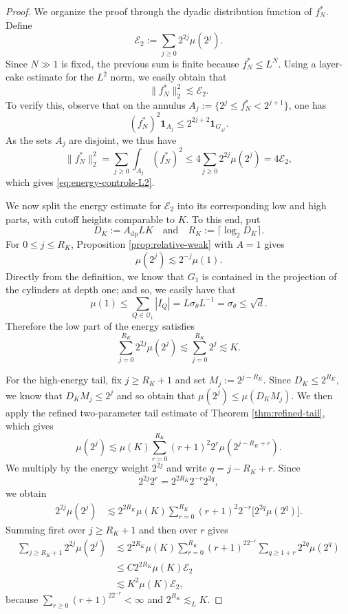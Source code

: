 \documentclass[12pt]{amsart}
\numberwithin{equation}{section}
\begin{document}
\begin{proof}
We organize the proof through the dyadic distribution function of $f_N^*$.  Define
\begin{equation}\label{eq:dyadic-energy}
 \mathcal E_2:=\sum_{j\geq0}2^{2j}\mu(2^j).
\end{equation}
Since $N \gg 1$ is fixed, the previous sum is finite because $f_N^*\leq L^N$.  Using a layer-cake estimate for the $L^2$ norm, we easily obtain that
\begin{equation}\label{eq:energy-controls-L2}
 \|f_N^*\|_2^2\lesssim\mathcal E_2.
\end{equation}
To verify this, observe that on the annulus $A_j:=\{2^j\leq f_N^*<2^{j+1}\}$, one has
\[
 (f_N^*)^2\mathbf1_{A_j}\leq2^{2j+2}\mathbf1_{G_{2^j}}.
\]
As the sets $A_j$ are disjoint, we thus have
\[
 \|f_N^*\|_2^2
 =\sum_{j\geq0}\int_{A_j}(f_N^*)^2
 \leq4\sum_{j\geq0}2^{2j}\mu(2^j)
 =4\mathcal E_2,
\]
which gives \eqref{eq:energy-controls-L2}.

We now split the energy estimate for $\mathcal{E}_2$ into its corresponding low and high parts, with cutoff heights comparable to $K$.  To this end, put
\[
 D_K:=A_{\mathrm{dp}}LK
 \quad \textrm{and} \quad 
 R_K:=\lceil\log_2D_K\rceil.
\]
For $0\leq j\leq R_K$, Proposition \ref{prop:relative-weak} with $A=1$ gives
\[
 \mu(2^j)\lesssim2^{-j}\mu(1).
\]
Directly from the definition, we know that $G_1$ is contained in the projection of the cylinders at depth one; and so, we easily have that
\[
 \mu(1)\leq\sum_{Q\in\mathscr Q_1}|I_Q|
 =L\sigma_\theta L^{-1}=\sigma_\theta\leq\sqrt d.
\]
Therefore the low part of the energy satisfies
\begin{equation}\label{eq:low-energy}
 \sum_{j=0}^{R_K}2^{2j}\mu(2^j)
 \lesssim\sum_{j=0}^{R_K}2^j
 \lesssim K.
\end{equation}

For the high-energy tail, fix $j\geq R_K+1$ and set $M_j:=2^{j-R_K}$.  Since $D_K\leq2^{R_K}$, we know that
$ D_KM_j\leq2^j$ and so obtain that $\mu(2^j)\leq\mu(D_KM_j)$. We then apply the refined two-parameter tail estimate of Theorem \ref{thm:refined-tail}, which gives
\begin{equation}\label{eq:high-energy-pointwise}
 \mu(2^j)
 \lesssim\mu(K)\sum_{r=0}^{R_K}(r+1)^2 2^r
 \mu(2^{j-R_K+r}).
\end{equation}
We multiply by the energy weight $2^{2j}$ and write $q=j-R_K+r$.  Since
\[
 2^{2j}2^r
 =2^{2R_K}2^{-r}2^{2q},
\]
we obtain
\begin{align*}
 2^{2j}\mu(2^j)
 &\lesssim2^{2R_K}\mu(K)
 \sum_{r=0}^{R_K}(r+1)^2 2^{-r}
 \bigl[2^{2q}\mu(2^q)\bigr].
\end{align*}
Summing first over $j\geq R_K+1$ and then over $r$ gives
\begin{align*}
 \sum_{j\geq R_K+1}2^{2j}\mu(2^j)
 &\lesssim2^{2R_K}\mu(K)
 \sum_{r=0}^{R_K}(r+1)^22^{-r}
 \sum_{q\geq1+r}2^{2q}\mu(2^q)\\[1ex]
 &\leq C2^{2R_K}\mu(K)\mathcal E_2 \\[1ex]
 & \lesssim K^2\mu(K)\mathcal E_2,
\end{align*}
because $\sum_{r\geq0}(r+1)^22^{-r}<\infty$ and
$2^{R_K}\lesssim_LK$. 


\end{proof}
\end{document}
